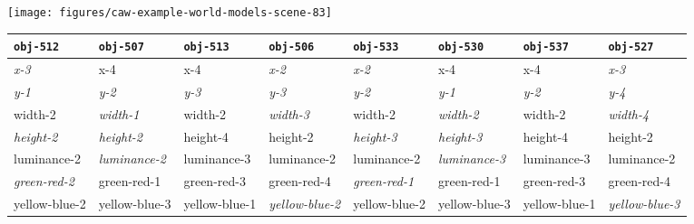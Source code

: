 
\parbox{\textwidth}{
  \renewcommand{\arraystretch}{1.3}
  \texttt{[image: figures/caw-example-world-models-scene-83]}
  
  \vspace{0.5cm}
  \begin{tabular*}{\textwidth}{@{}p{2.05cm}@{}p{2.05cm}@{}p{2.05cm}@{}p{2.05cm}@{}||p{2.05cm}@{}p{2.05cm}@{}p{2.05cm}@{}p{2.05cm}}
    {\tt obj-512} & {\tt obj-507} & {\tt obj-513} & {\tt obj-506} & {\tt obj-533} & {\tt obj-530} & {\tt obj-537} & {\tt obj-527} \\
    \hline
    \textcolor{dark}{\slshape x-3 } & { x-4 } & { x-4} & \textcolor{dark}{\slshape  x-2} & \textcolor{dark}{\slshape  x-2} & {  x-4} & {  x-4} & \textcolor{dark}{\slshape  x-3} \\
    \textcolor{dark}{\slshape y-1} & \textcolor{dark}{\slshape y-2} & \textcolor{dark}{\slshape y-3} & \textcolor{dark}{\slshape y-3} & \textcolor{dark}{\slshape y-2} & \textcolor{dark}{\slshape y-1} & \textcolor{dark}{\slshape y-2} & \textcolor{dark}{\slshape y-4 }\\
    { width-2} & \textcolor{dark}{\slshape width-1} & { width-2} & \textcolor{dark}{\slshape width-3} & { width-2} & \textcolor{dark}{\slshape width-2} & { width-2} & \textcolor{dark}{\slshape width-4 }\\
    \textcolor{dark}{\slshape height-2} & \textcolor{dark}{\slshape height-2} & { height-4} & { height-2} & \textcolor{dark}{\slshape height-3} & \textcolor{dark}{\slshape height-3} & { height-4} & { height-2 }\\
    { luminance-2} & \textcolor{dark}{\slshape luminance-2} & { luminance-3} & { luminance-2} & { luminance-2} & \textcolor{dark}{\slshape luminance-3} & { luminance-3} & { luminance-2 }\\
    \textcolor{dark}{\slshape green-red-2} & { green-red-1} & { green-red-3} & { green-red-4} & \textcolor{dark}{\slshape green-red-1} & { green-red-1} & { green-red-3} & { green-red-4 }\\
    { yellow-blue-2} & { yellow-blue-3} & { yellow-blue-1} & \textcolor{dark}{\slshape yellow-blue-2} & { yellow-blue-2} & { yellow-blue-3} & { yellow-blue-1} & \textcolor{dark}{\slshape yellow-blue-3}\\
    \hline
    
  \end{tabular*}
  \vspace{0.2cm}}